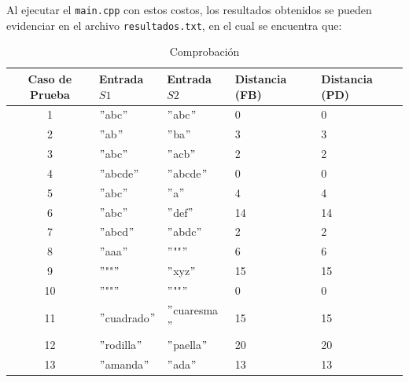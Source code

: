 Al ejecutar el \verb|main.cpp| con estos costos, los resultados obtenidos se pueden evidenciar en el archivo \verb|resultados.txt|, en el cual se encuentra que:

\begin{table}[H]
    \centering
    \footnotesize
    \begin{tabular}{|c|l|l|l|l|}
    \hline
    \textbf{Caso de Prueba} & \textbf{Entrada \( S1 \)} & \textbf{Entrada \( S2 \)} & \textbf{Distancia (FB)} & \textbf{Distancia (PD)} \\
    \hline
    1 & $"$abc$"$ & $"$abc$"$ & 0 & 0 \\
    2 & $"$ab$"$ & $"$ba$"$ & 3 & 3 \\
    3 & $"$abc$"$ & $"$acb$"$ & 2 & 2 \\
    4 & $"$abcde$"$ & $"$abcde$"$ & 0 & 0 \\
    5 & $"$abc$"$ & $"$a$"$ & 4 & 4 \\
    6 & $"$abc$"$ & $"$def$"$ & 14 & 14 \\
    7 & $"$abcd$"$ & $"$abdc$"$ & 2 & 2 \\
    8 & $"$aaa$"$ & $"$""$"$ & 6 & 6 \\
    9 & $"$""$"$ & $"$xyz$"$ & 15 & 15 \\
    10 & $"$""$"$ & $"$""$"$ & 0 & 0 \\
    11 & $"$cuadrado$"$ & $"$cuaresma$"$ & 15 & 15 \\
    12 & $"$rodilla$"$ & $"$paella$"$ & 20 & 20 \\
    13 & $"$amanda$"$ & $"$ada$"$ & 13 & 13 \\
    \hline
    \end{tabular}
    \caption{Comprobación }
    \label{fig:resultados}
\end{table}


